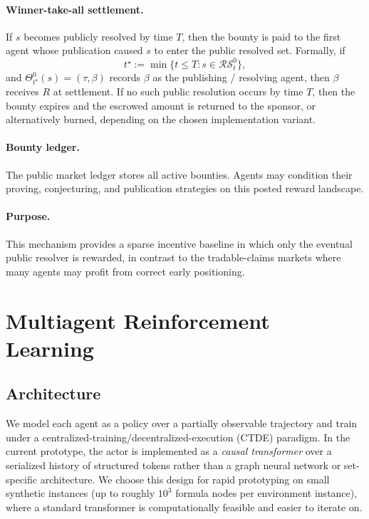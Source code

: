 \documentclass[letterpaper]{article} %
\begin{document}
\paragraph{Winner-take-all settlement.}
If $s$ becomes publicly resolved by time $T$, then the bounty is paid to the first agent whose publication caused $s$ to enter the public resolved set. Formally, if
\[
t^\star := \min\{t\le T : s\in\mathcal{RS}^0_t\},
\]
and $\Theta^0_{t^\star}(s)=(\tau,\beta)$ records $\beta$ as the publishing / resolving agent, then $\beta$ receives $R$ at settlement. If no such public resolution occurs by time $T$, then the bounty expires and the escrowed amount is returned to the sponsor, or alternatively burned, depending on the chosen implementation variant.

\paragraph{Bounty ledger.}
The public market ledger stores all active bounties. Agents may condition their proving, conjecturing, and publication strategies on this posted reward landscape.

\paragraph{Purpose.}
This mechanism provides a sparse incentive baseline in which only the eventual public resolver is rewarded, in contrast to the tradable-claims markets where many agents may profit from correct early positioning.

\section{Multiagent Reinforcement Learning}
\subsection{Architecture}

We model each agent as a policy over a partially observable trajectory and train under a centralized-training/decentralized-execution (CTDE) paradigm. In the current prototype, the actor is implemented as a \emph{causal transformer} over a serialized history of structured tokens rather than a graph neural network or set-specific architecture. We choose this design for rapid prototyping on small synthetic instances (up to roughly $10^3$ formula nodes per environment instance), where a standard transformer is computationally feasible and easier to iterate on.
\end{document}
